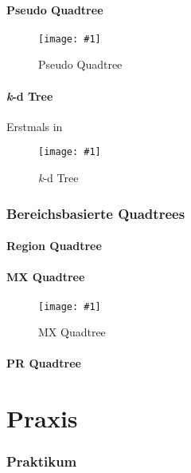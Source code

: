 \documentclass[%
			paper=a4,%
			DIV12,
			draft=false,%
			titlepage
			]{scrartcl}
\newcommand{\myfig}[4] {
 \begin{figure}[tbph]
	 \centering
	 \texttt{[image: \#1]}
	 \caption{#4}
	 \label{fig:#2}
 \end{figure}
}
\begin{document}

\subsection{Pseudo Quadtree}
\myfig{img/pseudoquadtree-ins3-trimmed}{pseudoquadtree}{width=.6\textwidth}{Pseudo Quadtree}

\subsection{\textit{k}-d Tree}
Erstmals in \cite{Bentley:1975}
\myfig{img/kdtree-tree-full-trimmed}{kdtree}{width=.8\textwidth}{\textit{k}-d Tree}

\section{Bereichsbasierte Quadtrees}
\subsection{Region Quadtree}

\subsection{MX Quadtree}
\myfig{img/mxquadtre-full-trimmed}{mxquadtree}{width=.7\textwidth}{MX Quadtree}


\subsection{PR Quadtree}

\part{Praxis}

\section{Praktikum}


\newpage

\nocite{*} %

\end{document}

